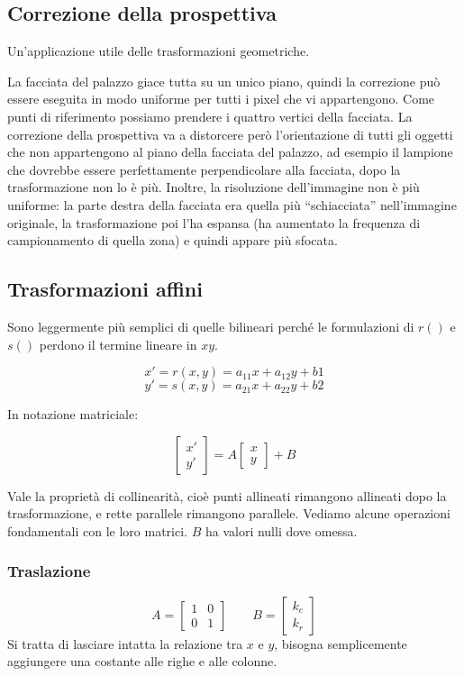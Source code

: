 \documentclass[a4paper,11pt]{article}
\begin{document}
\subsection{Correzione della prospettiva}
Un'applicazione utile delle trasformazioni geometriche.
\par
La facciata del palazzo giace tutta su un unico piano, quindi la correzione può essere eseguita in modo uniforme per tutti i pixel che vi appartengono.
Come punti di riferimento possiamo prendere i quattro vertici della facciata. La correzione della prospettiva va a distorcere però l'orientazione di tutti
gli oggetti che non appartengono al piano della facciata del palazzo, ad esempio il lampione che dovrebbe essere perfettamente perpendicolare alla facciata,
dopo la trasformazione non lo è più. Inoltre, la risoluzione dell'immagine non è più uniforme: la parte destra della facciata era quella più ``schiacciata''
nell'immagine originale, la trasformazione poi l'ha espansa (ha aumentato la frequenza di campionamento di quella zona) e quindi appare più sfocata.

\subsection{Trasformazioni affini}
Sono leggermente più semplici di quelle bilineari perché le formulazioni di $r()$ e $s()$ perdono il termine lineare in $xy$.

\[
x' = r(x,y) = a_{11} x + a_{12} y + b1
\]
\[
y' = s(x,y) = a_{21} x + a_{22} y + b2
\]

In notazione matriciale:

\begin{equation*}
\begin{bmatrix} x' \\ y' \end{bmatrix} = A \begin{bmatrix} x \\ y \end{bmatrix} + B
\end{equation*}

Vale la proprietà di collinearità, cioè punti allineati rimangono allineati dopo la trasformazione, e rette parallele rimangono parallele.
Vediamo alcune operazioni fondamentali con le loro matrici. $B$ ha valori nulli dove omessa.

\subsubsection{Traslazione}
\[
A = \begin{bmatrix} 1 & 0 \\ 0 & 1 \end{bmatrix} \qquad
B = \begin{bmatrix} k_c \\ k_r \end{bmatrix}
\]
Si tratta di lasciare intatta la relazione tra $x$ e $y$, bisogna semplicemente aggiungere una costante alle righe e alle colonne.
\end{document}
